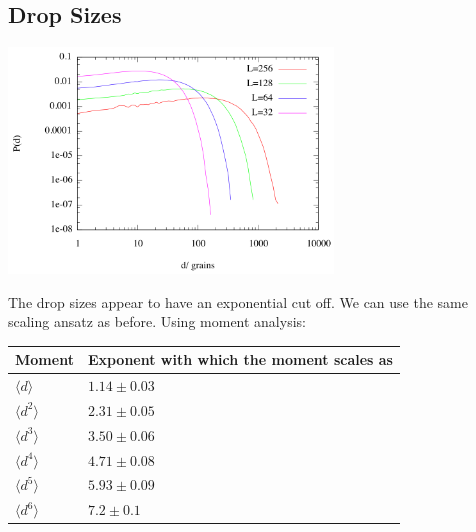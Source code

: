 \documentclass[twoside]{article}
\begin{document}
\subsection{Drop Sizes}
\begin{center}
  \includegraphics[height=60mm]{pvd.png}
  
\end{center}
The drop sizes appear to have an exponential cut off. We can use the same scaling ansatz as before. Using moment analysis:
\begin{center}
    \begin{tabular}{|l|l|}
    \hline
    Moment & Exponent with which the moment scales as  \\ \hline
    $\langle d \rangle$ & $1.14 \pm 0.03$\\ \hline
    $\langle d^2 \rangle$ & $2.31 \pm 0.05$ \\ \hline
    $\langle d^3 \rangle$ &  $3.50 \pm 0.06$ \\ \hline
    $\langle d^4 \rangle$ &  $4.71 \pm 0.08$ \\ \hline
    $\langle d^5 \rangle$ &  $5.93 \pm 0.09$ \\ \hline
    $\langle d^6 \rangle$ &  $7.2 \pm 0.1$ \\ \hline
    \end{tabular}
\end{center}
\end{document}
